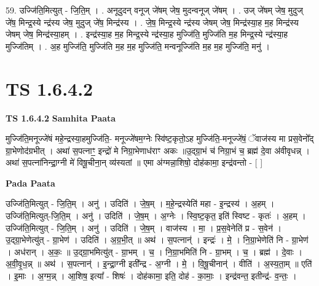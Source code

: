 \documentclass[17pt]{extarticle}
\begin{document}
59. उज्जि॑ति॒मित्युत् - जि॒ति॒म् । . अनूदुदन् वनूज् जे॑षम् जेष॒ मुदन्वनूज् जे॑षम् । . उज् जे॑षम् जेष॒ मुदुज् जे॑ष॒ मिन्द्र॒स्ये न्द्र॑स्य जेष॒ मुदुज् जे॑ष॒ मिन्द्र॑स्य । . जे॒ष॒ मिन्द्र॒स्ये न्द्र॑स्य जेषम् जेष॒ मिन्द्र॑स्या॒ह म॒ह मिन्द्र॑स्य जेषम् जेष॒ मिन्द्र॑स्या॒हम् । . इन्द्र॑स्या॒ह म॒ह मिन्द्र॒स्ये न्द्र॑स्या॒ह मुज्जि॑ति॒ मुज्जि॑ति म॒ह मिन्द्र॒स्ये न्द्र॑स्या॒ह मुज्जि॑तिम् । . अ॒ह मुज्जि॑ति॒ मुज्जि॑ति म॒ह म॒ह मुज्जि॑ति॒ मन्वनूज्जि॑ति म॒ह म॒ह मुज्जि॑ति॒ मनु॑ । \newline
\pagebreak
{}
\section*{ TS 1.6.4.2 }

\textbf{TS 1.6.4.2 } \newline
\textbf{Samhita Paata} \newline

मुज्जि॑ति॒मनूज्जे॑षं महे॒न्द्रस्या॒हमुज्जि॑ति॒- मनूज्जे॑षम॒ग्नेः स्वि॑ष्ट॒कृतो॒ऽह मुज्जि॑ति॒-मनूज्जे॑षं॒ ॅवाज॑स्य मा प्रस॒वेनो᳚द् ग्रा॒भेणोद॑ग्रभीत् । अथा॑ स॒पत्नाꣳ॒॒ इन्द्रो॑ मे निग्रा॒भेणाध॑राꣳ अकः ॥उ॒द्ग्रा॒भं च॑ निग्रा॒भं च॒ ब्रह्म॑ दे॒वा अ॑वीवृधन्न् । अथा॑ स॒पत्ना॑निन्द्रा॒ग्नी मे॑ विषू॒चीना॒न् व्य॑स्यतां ॥ एमा अ॑ग्मन्ना॒शिषो॒ दोह॑कामा॒ इन्द्र॑वन्तो - [ ] \newline

\textbf{Pada Paata} \newline

उज्जि॑ति॒मित्युत् - जि॒ति॒म् । अनु॑ । उदिति॑ । जे॒ष॒म् । म॒हे॒न्द्रस्येति॑ महा - इ॒न्द्रस्य॑ । अ॒हम् । उज्जि॑ति॒मित्युत्-जि॒ति॒म् । अनु॑ । उदिति॑ । जे॒ष॒म् । अ॒ग्नेः । स्वि॒ष्ट॒कृत॒ इति॑ स्विष्ट - कृतः॑ । अ॒हम् । उज्जि॑ति॒मित्युत् - जि॒ति॒म् । अनु॑ । उदिति॑ । जे॒ष॒म् । वाज॑स्य । मा॒ । प्र॒स॒वेनेति॑ प्र - स॒वेन॑ । उ॒द्ग्रा॒भेणेत्यु॑त् - ग्रा॒भेण॑ । उदिति॑ । अ॒ग्र॒भी॒त् ॥ अथ॑ । स॒पत्नान्॑ । इन्द्रः॑ । मे॒ । नि॒ग्रा॒भेणेति॑ नि - ग्रा॒भेण॑ । अध॑रान् । अ॒कः॒ ॥ उ॒द्ग्रा॒भमित्यु॑त् - ग्रा॒भम् । च॒ । नि॒ग्रा॒भमिति॑ नि - ग्रा॒भम् । च॒ । ब्रह्म॑ । दे॒वाः । अ॒वी॒वृ॒ध॒न्न् ॥ अथ॑ । स॒पत्नान्॑ । इ॒न्द्रा॒ग्नी इती᳚न्द्र - अ॒ग्नी । मे॒ । वि॒षू॒चीनान्॑ । वीति॑ । अ॒स्य॒ता॒म् ॥ एति॑ । इ॒माः । अ॒ग्म॒न्न् । आ॒शिष॒ इत्या᳚ - शिषः॑ । दोह॑कामा॒ इति॒ दोह॑ - का॒माः॒ । इन्द्र॑वन्त॒ इतीन्द्र॑- व॒न्तः॒ ।  \newline
\end{document}
